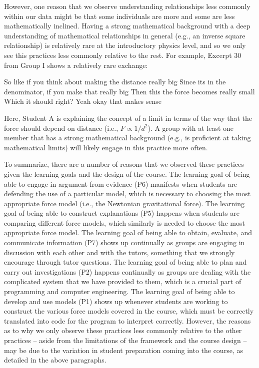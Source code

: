 \documentclass{msuphddissertation}
\begin{document}
\begin{doublespace}
However, one reason that we observe understanding relationships less commonly within our data might be that some individuals are more and some are less mathematically inclined.  Having a strong mathematical background with a deep understanding of mathematical relationships in general (e.g., an inverse square relationship) is relatively rare at the introductory physics level, and so we only see this practices less commonly relative to the rest.  For example, Excerpt 30 from Group I shows a relatively rare exchange: \begin{description}
\SA So like if you think about making the distance really big
\SA Since its in the denominator, if you make that really big
\SA Then this {the force} becomes really small
\SA Which it should right?
\SB Yeah okay that makes sense
\end{description}  Here, Student A is explaining the concept of a limit in terms of the way that the force should depend on distance (i.e., $F\propto1/d^2$).  A group with at least one member that has a strong mathematical background (e.g., is proficient at taking mathematical limits) will likely engage in this practice more often.  %

%
%
%

To summarize, there are a number of reasons that we observed these practices given the learning goals and the design of the course.  The learning goal of being able to engage in argument from evidence (P6) manifests when students are defending the use of a particular model, which is necessary to choosing the most appropriate force model (i.e., the Newtonian gravitational force).  The learning goal of being able to construct explanations (P5) happens when students are comparing different force models, which similarly is needed to choose the most appropriate force model.  The learning goal of being able to obtain, evaluate, and communicate information (P7) shows up continually as groups are engaging in discussion with each other and with the tutors, something that we strongly encourage through tutor questions.  The learning goal of being able to plan and carry out investigations (P2) happens continually as groups are dealing with the complicated system that we have provided to them, which is a crucial part of programming and computer engineering.  The learning goal of being able to develop and use models (P1) shows up whenever students are working to construct the various force models covered in the course, which must be correctly translated into code for the program to interpret correctly.  However, the reasons as to why we only observe these practices less commonly relative to the other practices -- aside from the limitations of the framework and the course design -- may be due to the variation in student preparation coming into the course, as detailed in the above paragraphs.


\end{doublespace}
\end{document}
